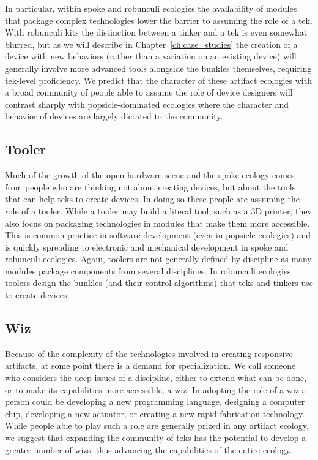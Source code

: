 In particular, within spoke and robunculi ecologies the availability of modules that package complex technologies lower the barrier to assuming the role of a tek. 
With robunculi kits the distinction between a tinker and a tek is even somewhat blurred, but as we will describe in Chapter~\ref{ch:case_studies} the creation of a device with new behaviors (rather than a variation on an existing device) will generally involve more advanced tools alongside the bunkles themselves, requiring tek-level proficiency.
We predict that the character of these artifact ecologies with a broad community of people able to assume the role of device designers will contrast sharply with popsicle-dominated ecologies where the character and behavior of devices are largely dictated to the community.

\subsection{Tooler}
Much of the growth of the open hardware scene and the spoke ecology comes from people who are thinking not about creating devices, but about the tools that can help teks to create devices. In doing so these people are assuming the role of a tooler. While a tooler may build a literal tool, such as a 3D printer, they also focus on packaging technologies in modules that make them more accessible. This is common practice in software development (even in popsicle ecologies) and is quickly spreading to electronic and mechanical development in spoke and robunculi ecologies. Again, toolers are not generally defined by discipline as many modules package components from several disciplines. In robunculi ecologies toolers design the bunkles (and their control algorithms) that teks and tinkers use to create devices.

\subsection{Wiz}
Because of the complexity of the technologies involved in creating responsive artifacts, at some point there is a demand for specialization. 
We call someone who considers the deep issues of a discipline, either to extend what can be done, or to make its capabilities more accessible, a wiz.
In adopting the role of a wiz a person could be developing a new programming language, designing a computer chip, developing a new actuator, or creating a new rapid fabrication technology. 
While people able to play such a role are generally prized in any artifact ecology, we suggest that expanding the community of teks has the potential to develop a greater number of wizs, thus advancing the capabilities of the entire ecology.

